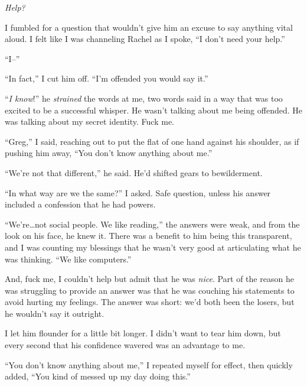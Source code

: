 \emph{Help?}



I fumbled for a question that wouldn't give him an excuse to say anything vital aloud.  I felt like I was channeling Rachel as I spoke, ``I don't need your help.''



``I--''



``In fact,'' I cut him off.  ``I'm offended you would say it.''



``\emph{I know}!'' he \emph{strained} the words at me, two words said in a way that was too excited to be a successful whisper.  He wasn't talking about me being offended.  He was talking about my secret identity.  Fuck me.



``Greg,'' I said, reaching out to put the flat of one hand against his shoulder, as if pushing him away, ``You don't know anything about me.''



``We're not that different,'' he said.  He'd shifted gears to bewilderment.



``In what way are we the same?'' I asked.  Safe question, unless his answer included a confession that he had powers.



``We're\ldots not social people.  We like reading,'' the answers were weak, and from the look on his face, he knew it.  There was a benefit to him being this transparent, and I was counting my blessings that he wasn't very good at articulating what he was thinking.  ``We like computers.''



And, fuck me, I couldn't help but admit that he was \emph{nice}.  Part of the reason he was struggling to provide an answer was that he was couching his statements to avoid hurting my feelings.  The answer was short: we'd both been the losers, but he wouldn't say it outright.



I let him flounder for a little bit longer.  I didn't want to tear him down, but every second that his confidence wavered was an advantage to me.



``You don't know anything about me,'' I repeated myself for effect, then quickly added, ``You kind of messed up my day doing this.''



